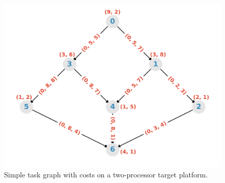 \documentclass[12pt]{article}
\begin{document}
\begin{figure}
	\centering	
	\includegraphics[scale=0.8]{simple_graph.png}
	\caption{Simple task graph with costs on a two-processor target platform.}	
	\label{plot.simple_example}
\end{figure}
\end{document}
